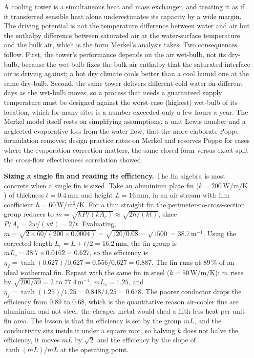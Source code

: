 

\begin{mastery}
A cooling tower is a simultaneous heat and mass exchanger, and treating it as if
it transferred sensible heat alone underestimates its capacity by a wide margin.
The driving potential is not the temperature difference between water and air but
the enthalpy difference between saturated air at the water-surface temperature
and the bulk air, which is the form Merkel's analysis takes. Two consequences
follow. First, the tower's performance depends on the air wet-bulb, not its
dry-bulb, because the wet-bulb fixes the bulk-air enthalpy that the saturated
interface air is driving against; a hot dry climate cools better than a cool
humid one at the same dry-bulb. Second, the same tower delivers different cold
water on different days as the wet-bulb moves, so a process that needs a
guaranteed supply temperature must be designed against the worst-case (highest)
wet-bulb of its location, which for many sites is a number exceeded only a few
hours a year. The Merkel model itself rests on simplifying assumptions, a unit
Lewis number and a neglected evaporative loss from the water flow, that the more
elaborate Poppe formulation removes; design practice rates on Merkel and reserves
Poppe for cases where the evaporation correction matters, the same closed-form
versus exact split the cross-flow effectiveness correlation showed.
\end{mastery}

\textbf{Sizing a single fin and reading its efficiency.} The fin algebra is most
concrete when a single fin is sized. Take an aluminium plate fin
($k = 200\,\si{\watt\per\meter\per\kelvin}$) of thickness $t = 0.4\,\si{\milli
\meter}$ and height $L = 16\,\si{\milli\meter}$, in an air stream with film
coefficient $h = 60\,\si{\watt\per\meter\squared\per\kelvin}$. For a thin straight
fin the perimeter-to-cross-section group reduces to $m = \sqrt{hP/(kA_c)} \approx
\sqrt{2h/(kt)}$, since $P/A_c = 2w/(wt) = 2/t$. Evaluating, $m = \sqrt{2\times
60/(200\times 0.0004)} = \sqrt{120/0.08} = \sqrt{1500} = 38.7\,\text{m}^{-1}$.
Using the corrected length $L_c = L + t/2 = 16.2\,\si{\milli\meter}$, the fin
group is $mL_c = 38.7\times 0.0162 = 0.627$, so the efficiency is $\eta_f =
\tanh(0.627)/0.627 = 0.556/0.627 = 0.887$. The fin runs at $89\,\%$ of an ideal
isothermal fin. Repeat with the same fin in steel
($k = 50\,\si{\watt\per\meter\per\kelvin}$): $m$ rises by $\sqrt{200/50} = 2$ to
$77.4\,\text{m}^{-1}$, $mL_c = 1.25$, and $\eta_f = \tanh(1.25)/1.25 =
0.848/1.25 = 0.678$. The poorer conductor drops the efficiency from $0.89$ to
$0.68$, which is the quantitative reason air-cooler fins are aluminium and not
steel: the cheaper metal would shed a fifth less heat per unit fin area. The
lesson is that fin efficiency is set by the group $mL$, and the conductivity sits
inside it under a square root, so halving $k$ does not halve the efficiency, it
moves $mL$ by $\sqrt{2}$ and the efficiency by the slope of $\tanh(mL)/mL$ at the
operating point.


